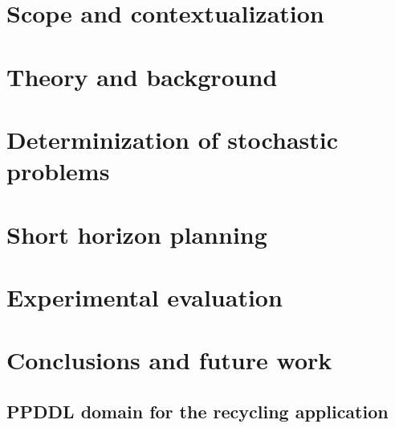 \documentclass[11pt,a4paper,oldfontcommands,oneside]{memoir}
\begin{document}



\cleardoublepage


\cleardoublepage



\cleardoublepage


\setcounter{secnumdepth}{2}
\setcounter{tocdepth}{2}

\tableofcontents

\cleardoublepage


%

\chapter{Scope and contextualization}
\label{chap:scope}


\chapter{Theory and background}
\label{chap:theory}


\chapter{Determinization of stochastic problems}
\label{chap:determinization}


\chapter{Short horizon planning}
\label{chap:short-horizon-planning}


\chapter{Experimental evaluation}
\label{chap:experimental}


\chapter{Conclusions and future work}
\label{chap:conclusions}


\printbibliography

\begin{appendices}
\chapter{PPDDL domain for the recycling application}
\label{chap:ppddl-model}

\end{appendices}
\end{document}
